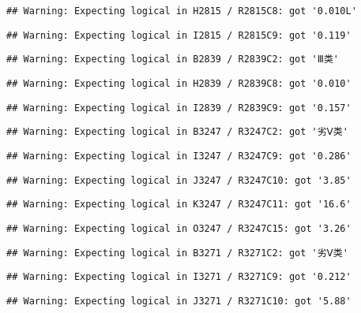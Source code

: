 \documentclass[
]{article}
\begin{document}
\begin{verbatim}
## Warning: Expecting logical in H2815 / R2815C8: got '0.010L'
\end{verbatim}

\begin{verbatim}
## Warning: Expecting logical in I2815 / R2815C9: got '0.119'
\end{verbatim}

\begin{verbatim}
## Warning: Expecting logical in B2839 / R2839C2: got 'Ⅲ类'
\end{verbatim}

\begin{verbatim}
## Warning: Expecting logical in H2839 / R2839C8: got '0.010'
\end{verbatim}

\begin{verbatim}
## Warning: Expecting logical in I2839 / R2839C9: got '0.157'
\end{verbatim}

\begin{verbatim}
## Warning: Expecting logical in B3247 / R3247C2: got '劣Ⅴ类'
\end{verbatim}

\begin{verbatim}
## Warning: Expecting logical in I3247 / R3247C9: got '0.286'
\end{verbatim}

\begin{verbatim}
## Warning: Expecting logical in J3247 / R3247C10: got '3.85'
\end{verbatim}

\begin{verbatim}
## Warning: Expecting logical in K3247 / R3247C11: got '16.6'
\end{verbatim}

\begin{verbatim}
## Warning: Expecting logical in O3247 / R3247C15: got '3.26'
\end{verbatim}

\begin{verbatim}
## Warning: Expecting logical in B3271 / R3271C2: got '劣Ⅴ类'
\end{verbatim}

\begin{verbatim}
## Warning: Expecting logical in I3271 / R3271C9: got '0.212'
\end{verbatim}

\begin{verbatim}
## Warning: Expecting logical in J3271 / R3271C10: got '5.88'
\end{verbatim}
\end{document}
